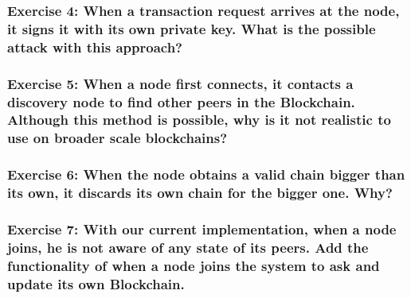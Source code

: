 \documentclass[12pt,a4paper]{article}
\theoremstyle{definition}
\begin{document}
\subsubsection*{Exercise 4: When a transaction request arrives at the node, it signs it with its own private key. What is the possible attack with this approach?}

\subsubsection*{Exercise 5: When a node first connects, it contacts a discovery node to find other peers in the Blockchain. Although this method is possible, why is it not realistic to use on broader scale blockchains? }

\subsubsection*{Exercise 6: When the node obtains a valid chain bigger than its own, it discards its own chain for the bigger one. Why? }

\subsubsection*{Exercise 7: With our current implementation, when a node joins, he is not aware of any state of its peers. Add the functionality of when a node joins the system to ask and update its own Blockchain.}



\end{document}
